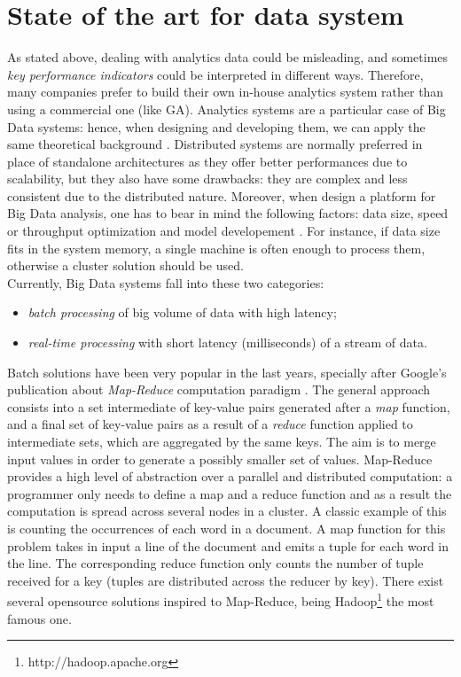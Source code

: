 \section{State of the art for data system}
As stated above, dealing with analytics data could be misleading, and sometimes \textit{key performance indicators} could be interpreted in different ways. Therefore, many companies prefer to build their own in-house analytics system rather than using a commercial one (like GA). Analytics systems are a particular case of Big Data systems: hence, when designing and developing them, we can apply the same theoretical background \cite{bib49}. Distributed systems are normally preferred in place of standalone architectures as they offer better performances due to scalability, but they also have some drawbacks: they are complex and less consistent due to the distributed nature. Moreover, when design a platform for Big Data analysis, one has to bear in mind the following factors: data size, speed or throughput optimization and model developement \cite{bib48}. For instance, if data size fits in the system memory, a single machine is often enough to process them, otherwise a cluster solution should be used.\\
Currently, Big Data systems fall into these two categories:
\begin{itemize}
\item \textit{batch processing} of big volume of data with high latency;
\item \textit{real-time processing} with short latency (milliseconds) of a stream of data.
\end{itemize}
Batch solutions have been very popular in the last years, specially after Google's publication about \textit{Map-Reduce} computation paradigm \cite{bib25}. The general approach consists into a set intermediate of key-value pairs generated after a \textit{map} function, and a final set of key-value pairs as a result of a \textit{reduce} function applied to intermediate sets, which are aggregated by the same keys. The aim is to merge input values in order to generate a possibly smaller set of values. Map-Reduce provides a high level of abstraction over a parallel and distributed computation: a programmer only needs to define a map and a reduce function and as a result the computation is spread across several nodes in a cluster. A classic example of this is counting the occurrences of each word in a document. A map function for this problem takes in input a line of the document and emits a tuple for each word in the line. The corresponding reduce function only counts the number of tuple received for a key (tuples are distributed across the reducer by key). There exist several opensource solutions inspired to Map-Reduce, being Hadoop\footnote{http://hadoop.apache.org} the most famous one.\\
